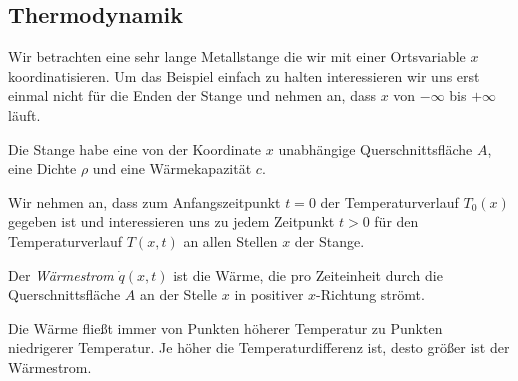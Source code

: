\documentclass{article}
\begin{document}
\subsection{Thermodynamik}
Wir betrachten eine sehr lange Metallstange die wir mit einer
Ortsvariable $x$ koordinatisieren. Um das Beispiel einfach zu halten
interessieren wir uns erst einmal nicht für die Enden der Stange und
nehmen an, dass $x$ von $-\infty$ bis $+\infty$ läuft.

Die Stange habe eine von der Koordinate $x$ unabhängige
Querschnittsfläche $A$, eine Dichte $\rho$ und eine Wärmekapazität
$c$.

Wir nehmen an, dass zum Anfangszeitpunkt $t=0$ der Temperaturverlauf
$T_0(x)$ gegeben ist und interessieren uns zu jedem Zeitpunkt $t> 0$
für den Temperaturverlauf $T(x,t)$ an allen Stellen $x$ der Stange.

Der \emph{Wärmestrom} $\dot q(x,t)$ ist die Wärme, die pro Zeiteinheit
durch die Querschnittsfläche $A$ an der Stelle $x$ in positiver
$x$-Richtung strömt.

Die Wärme fließt immer von Punkten höherer Temperatur zu Punkten
niedrigerer Temperatur. Je höher die Temperaturdifferenz ist, desto
größer ist der Wärmestrom.
\end{document}
